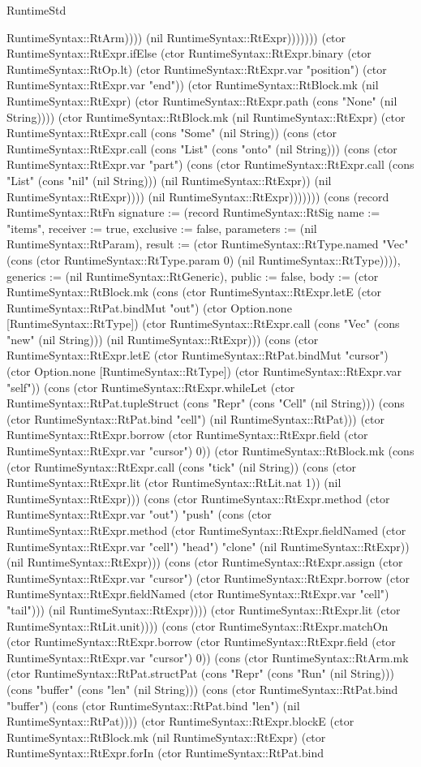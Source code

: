 \begin{lexlean}{RuntimeStd}
\begin{semanticmodule}
{RuntimeSyntax::RtArm)))) (nil RuntimeSyntax::RtExpr))))))) (ctor RuntimeSyntax::RtExpr.ifElse (ctor RuntimeSyntax::RtExpr.binary (ctor RuntimeSyntax::RtOp.lt) (ctor RuntimeSyntax::RtExpr.var "position") (ctor RuntimeSyntax::RtExpr.var "end")) (ctor RuntimeSyntax::RtBlock.mk (nil RuntimeSyntax::RtExpr) (ctor RuntimeSyntax::RtExpr.path (cons "None" (nil String)))) (ctor RuntimeSyntax::RtBlock.mk (nil RuntimeSyntax::RtExpr) (ctor RuntimeSyntax::RtExpr.call (cons "Some" (nil String)) (cons (ctor RuntimeSyntax::RtExpr.call (cons "List" (cons "onto" (nil String))) (cons (ctor RuntimeSyntax::RtExpr.var "part") (cons (ctor RuntimeSyntax::RtExpr.call (cons "List" (cons "nil" (nil String))) (nil RuntimeSyntax::RtExpr)) (nil RuntimeSyntax::RtExpr)))) (nil RuntimeSyntax::RtExpr))))))}) (cons (record RuntimeSyntax::RtFn {signature := (record RuntimeSyntax::RtSig {name := "items", receiver := true, exclusive := false, parameters := (nil RuntimeSyntax::RtParam), result := (ctor RuntimeSyntax::RtType.named "Vec" (cons (ctor RuntimeSyntax::RtType.param 0) (nil RuntimeSyntax::RtType)))}), generics := (nil RuntimeSyntax::RtGeneric), public := false, body := (ctor RuntimeSyntax::RtBlock.mk (cons (ctor RuntimeSyntax::RtExpr.letE (ctor RuntimeSyntax::RtPat.bindMut "out") (ctor Option.none [RuntimeSyntax::RtType]) (ctor RuntimeSyntax::RtExpr.call (cons "Vec" (cons "new" (nil String))) (nil RuntimeSyntax::RtExpr))) (cons (ctor RuntimeSyntax::RtExpr.letE (ctor RuntimeSyntax::RtPat.bindMut "cursor") (ctor Option.none [RuntimeSyntax::RtType]) (ctor RuntimeSyntax::RtExpr.var "self")) (cons (ctor RuntimeSyntax::RtExpr.whileLet (ctor RuntimeSyntax::RtPat.tupleStruct (cons "Repr" (cons "Cell" (nil String))) (cons (ctor RuntimeSyntax::RtPat.bind "cell") (nil RuntimeSyntax::RtPat))) (ctor RuntimeSyntax::RtExpr.borrow (ctor RuntimeSyntax::RtExpr.field (ctor RuntimeSyntax::RtExpr.var "cursor") 0)) (ctor RuntimeSyntax::RtBlock.mk (cons (ctor RuntimeSyntax::RtExpr.call (cons "tick" (nil String)) (cons (ctor RuntimeSyntax::RtExpr.lit (ctor RuntimeSyntax::RtLit.nat 1)) (nil RuntimeSyntax::RtExpr))) (cons (ctor RuntimeSyntax::RtExpr.method (ctor RuntimeSyntax::RtExpr.var "out") "push" (cons (ctor RuntimeSyntax::RtExpr.method (ctor RuntimeSyntax::RtExpr.fieldNamed (ctor RuntimeSyntax::RtExpr.var "cell") "head") "clone" (nil RuntimeSyntax::RtExpr)) (nil RuntimeSyntax::RtExpr))) (cons (ctor RuntimeSyntax::RtExpr.assign (ctor RuntimeSyntax::RtExpr.var "cursor") (ctor RuntimeSyntax::RtExpr.borrow (ctor RuntimeSyntax::RtExpr.fieldNamed (ctor RuntimeSyntax::RtExpr.var "cell") "tail"))) (nil RuntimeSyntax::RtExpr)))) (ctor RuntimeSyntax::RtExpr.lit (ctor RuntimeSyntax::RtLit.unit)))) (cons (ctor RuntimeSyntax::RtExpr.matchOn (ctor RuntimeSyntax::RtExpr.borrow (ctor RuntimeSyntax::RtExpr.field (ctor RuntimeSyntax::RtExpr.var "cursor") 0)) (cons (ctor RuntimeSyntax::RtArm.mk (ctor RuntimeSyntax::RtPat.structPat (cons "Repr" (cons "Run" (nil String))) (cons "buffer" (cons "len" (nil String))) (cons (ctor RuntimeSyntax::RtPat.bind "buffer") (cons (ctor RuntimeSyntax::RtPat.bind "len") (nil RuntimeSyntax::RtPat)))) (ctor RuntimeSyntax::RtExpr.blockE (ctor RuntimeSyntax::RtBlock.mk (nil RuntimeSyntax::RtExpr) (ctor RuntimeSyntax::RtExpr.forIn (ctor RuntimeSyntax::RtPat.bind }
\end{semanticmodule}
\end{lexlean}
